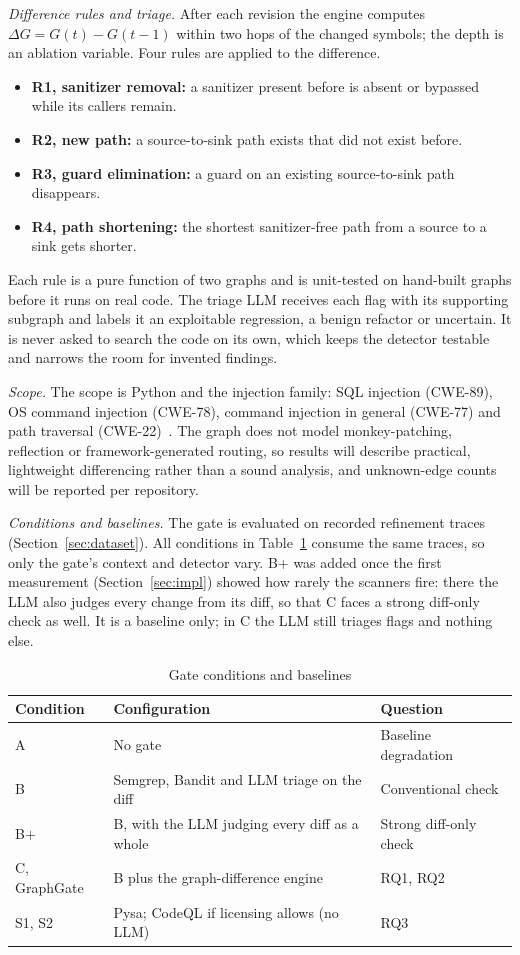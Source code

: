 \documentclass[conference]{IEEEtran}
\begin{document}
\textit{Difference rules and triage.} After each revision the engine computes $\Delta G = G(t) - G(t-1)$ within two hops of the changed symbols; the depth is an ablation variable. Four rules are applied to the difference.
\begin{itemize}
\item \textbf{R1, sanitizer removal:} a sanitizer present before is absent or bypassed while its callers remain.
\item \textbf{R2, new path:} a source-to-sink path exists that did not exist before.
\item \textbf{R3, guard elimination:} a guard on an existing source-to-sink path disappears.
\item \textbf{R4, path shortening:} the shortest sanitizer-free path from a source to a sink gets shorter.
\end{itemize}
Each rule is a pure function of two graphs and is unit-tested on hand-built graphs before it runs on real code. The triage LLM receives each flag with its supporting subgraph and labels it an exploitable regression, a benign refactor or uncertain. It is never asked to search the code on its own, which keeps the detector testable and narrows the room for invented findings.

\textit{Scope.} The scope is Python and the injection family: SQL injection (CWE-89), OS command injection (CWE-78), command injection in general (CWE-77) and path traversal (CWE-22)~\cite{mitrecwe}. The graph does not model monkey-patching, reflection or framework-generated routing, so results will describe practical, lightweight differencing rather than a sound analysis, and unknown-edge counts will be reported per repository.

\textit{Conditions and baselines.} The gate is evaluated on recorded refinement traces (Section~\ref{sec:dataset}). All conditions in Table~\ref{tab:conditions} consume the same traces, so only the gate's context and detector vary. B+ was added once the first measurement (Section~\ref{sec:impl}) showed how rarely the scanners fire: there the LLM also judges every change from its diff, so that C faces a strong diff-only check as well. It is a baseline only; in C the LLM still triages flags and nothing else.

\begin{table}[t]
\caption{Gate conditions and baselines}
\label{tab:conditions}
\centering
\footnotesize
\begin{tabular}{|p{1.3cm}|p{3.4cm}|p{2.4cm}|}
\hline
\textbf{Condition} & \textbf{Configuration} & \textbf{Question} \\
\hline
A & No gate & Baseline degradation \\
\hline
B & Semgrep, Bandit and LLM triage on the diff & Conventional check \\
\hline
B+ & B, with the LLM judging every diff as a whole & Strong diff-only check \\
\hline
C, GraphGate & B plus the graph-difference engine & RQ1, RQ2 \\
\hline
S1, S2 & Pysa; CodeQL if licensing allows (no LLM) & RQ3 \\
\hline
\end{tabular}
\end{table}
\end{document}
